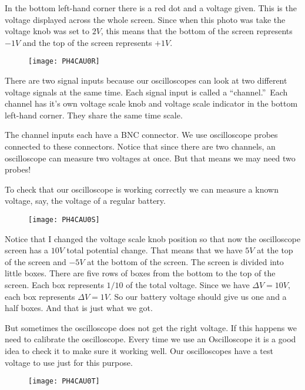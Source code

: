 In the bottom left-hand corner
there is a red dot and a voltage given. This is the voltage displayed across
the whole screen. Since when this photo was take the voltage knob was set to 
$2\unit{V}$, this means that the bottom of the screen represents $-1\unit{V}$
and the top of the screen represents $+1\unit{V}.$ 

\begin{figure}[h!]
	\centering
	\texttt{[image: PH4CAU0R]}
\end{figure}

There are two signal inputs because our oscilloscopes can look at two
different voltage signals at the same time. Each signal input is called a
\textquotedblleft channel.\textquotedblright\ Each channel has it's own
voltage scale knob and voltage scale indicator in the bottom left-hand
corner. They share the same time scale.

The channel inputs each have a BNC connector. We use oscilloscope probes
connected to these connectors. Notice that since there are two channels, an
oscilloscope can measure two voltages at once. But that means we may need
two probes!

To check that our oscilloscope is working correctly we can measure a known
voltage, say, the voltage of a regular battery.

\begin{figure}[h!]
	\centering
	\texttt{[image: PH4CAU0S]}
\end{figure}

Notice that I changed the voltage
scale knob position so that now the oscilloscope screen has a $10\unit{V}$
total potential change. That means that we have $5\unit{V}$ at the top of
the screen and $-5\unit{V}$ at the bottom of the screen. The screen is
divided into little boxes. There are five rows of boxes from the bottom to
the top of the screen. Each box represents $1/10$ of the total voltage.
Since we have $\Delta V=10\unit{V},$ each box represents $\Delta V=1\unit{V}%
. $ So our battery voltage should give us one and a half boxes. And that is
just what we got.

But sometimes the oscilloscope does not get the right voltage. If this
happens we need to calibrate the oscilloscope. Every time we use an
Oscilloscope it is a good idea to check it to make sure it working well. Our
oscilloscopes have a test voltage to use just for this purpose.

\begin{figure}[h!]
    \centering
    \texttt{[image: PH4CAU0T]}
\end{figure}

